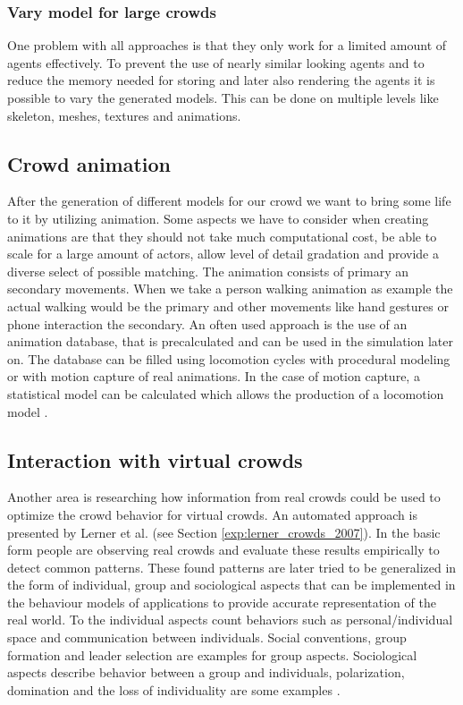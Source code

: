 \documentclass{acmsiggraph}               %
\begin{document}
\subsubsection{Vary model for large crowds} 
One problem with all approaches is that they only work for a limited amount of agents effectively. To prevent the use of nearly similar looking agents and to reduce the memory needed for storing and later also rendering the agents it is possible to vary the generated models. This can be done on multiple levels like skeleton, meshes, textures and animations. 
\cite{thalmann_crowd_2013}

\subsection{Crowd animation}

After the generation of different models for our crowd we want to bring some life to it by utilizing animation. Some aspects we have to consider when creating animations are that they should not take much computational cost, be able to scale for a large amount of actors, allow level of detail gradation and provide a diverse select of possible matching. The animation consists of primary an secondary movements. When we take a person walking animation as example the actual walking would be the primary and other movements like hand gestures or phone interaction the secondary.
An often used approach is the use of an animation database, that is precalculated and can be used in the simulation later on. The database can be filled using locomotion cycles with procedural modeling or with motion capture of real animations. In the case of motion capture, a statistical model can be calculated which allows the production of a locomotion model \cite{thalmann_crowd_2013}.

\subsection{Interaction with virtual crowds}

Another area is researching how information from real crowds could be used to optimize the crowd behavior for virtual crowds. An automated approach is presented by Lerner et al.  (see Section \ref{exp:lerner_crowds_2007}). In the basic form people are observing real crowds and evaluate these results empirically to detect common patterns. These found patterns are later tried to be generalized in the form of individual, group and sociological aspects that can be implemented in the behaviour models of applications to provide accurate representation of the real world. To the individual aspects count behaviors such as personal/individual space and communication between individuals. Social conventions, group formation and leader selection are examples for group aspects. Sociological aspects describe behavior between a group and individuals, polarization, domination and the loss of individuality are some examples \cite{benesch_atlas_1995} \cite{jeffrey_social_conventions_1998} \cite{mannoni_psychologie_1994}.  
\end{document}
